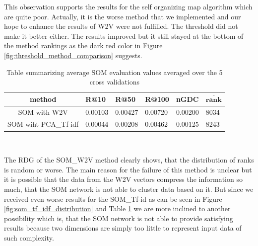 This observation supports the results for the self organizing map algorithm which are quite poor. Actually, it is the worse method that we implemented and our hope to enhance the results of W2V were not fulfilled. The threshold did not make it better either. The results improved but it still stayed at the bottom of the method rankings as the dark red color in Figure \ref{fig:threshold_method_comparison} suggests.

\begin{table}[h]
\centering
\renewcommand{\arraystretch}{1.5}
\begin{tabu} to 1\textwidth { | c || X[c] | X[c] | X[c] | X[c] | X[c] |}
 \hline
 \textbf{method} & \textbf{R@10} & \textbf{R@50} & \textbf{R@100} & \textbf{nGDC} & $ \boldsymbol{\overline{rank}} $ \\
 \hline
 \hline
 SOM with W2V & 0.00103 & 0.00427 & 0.00720 & 0.00200 & 8034 \\
 \hline
 SOM wiht PCA\_Tf-idf & 0.00044 & 0.00208 & 0.00462 & 0.00125 & 8243 \\
 \hline
\end{tabu} \\
\caption{Table summarizing average SOM evaluation values averaged over the 5 cross validations}
\label{table:som}
\end{table}

The RDG of the SOM\_W2V method clearly shows, that the distribution of ranks is random or worse. The main reason for the failure of this method is unclear but it is possible that the data from the W2V vectors compress the information so much, that the SOM network is not able to cluster data based on it. But since we received even worse results for the SOM\_Tf-id as can be seen in Figure \ref{fig:som_tf_idf_distribution} and Table \ref{table:som} we are more inclined to another possibility which is, that the SOM network is not able to provide satisfying results because two dimensions are simply too little to represent input data of such complexity.

